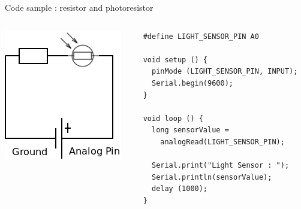 \begin{frame}[containsverbatim]{Code sample : resistor and photoresistor}
	\begin{columns}[c,onlytextwidth]
		\begin{column}[c]{.5\textwidth}
			\begin{center}
				\includegraphics [width=.9\textwidth,keepaspectratio]{img/resistor_photoresistor.png}
			\end{center}
		\end{column}
		\begin{column}[c]{.5\textwidth}
\begin{Verbatim}[fontsize=\scriptsize]
#define LIGHT_SENSOR_PIN A0

void setup () {
  pinMode (LIGHT_SENSOR_PIN, INPUT);
  Serial.begin(9600);
}

void loop () {
  long sensorValue = 
    analogRead(LIGHT_SENSOR_PIN);

  Serial.print("Light Sensor : ");
  Serial.println(sensorValue);
  delay (1000);
}
\end{Verbatim}
		\end{column}
	\end{columns}
\end{frame}


